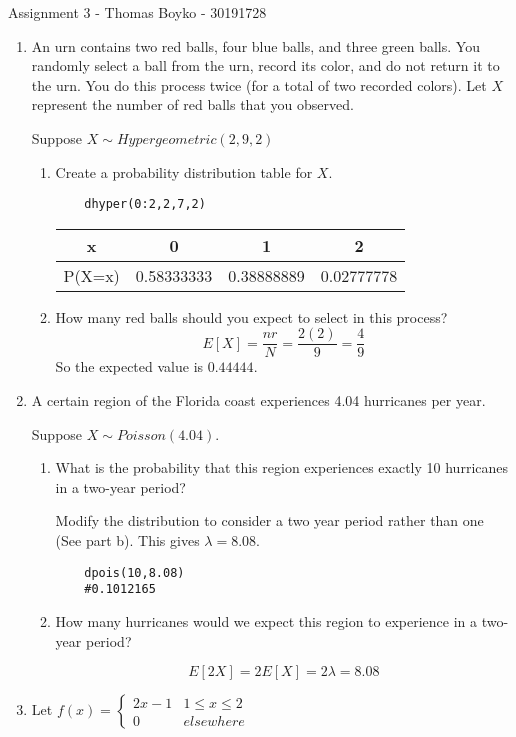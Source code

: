 \documentclass[]{article}
\begin{document}
\huge Assignment 3 - Thomas Boyko - 30191728
\normalsize
\begin{enumerate} 

\item An urn contains two red balls, four blue balls, and three green balls. You randomly select a ball from the urn, record its color, and do not return it to the urn. You do this process twice (for a total of two recorded colors). Let $X$ represent the number of red balls that you observed.

Suppose $X\sim Hypergeometric(2,9,2)$
\begin{enumerate}[label= (\alph*)] 
\item Create a probability distribution table for $X$.
\begin{verbatim}
    dhyper(0:2,2,7,2)
\end{verbatim}
\begin{center}
\begin{tabular}{|c|c|c|c|}
    \hline
    x & 0 & 1 & 2\\
    \hline
    P(X=x)&0.58333333&0.38888889&0.02777778\\
    \hline 
\end{tabular}
\end{center}

\item How many red balls should you expect to select in this process?
\[E[X]=\frac{nr}{N}=\frac{2(2)}{9}=\frac{4}{9}\]
So the expected value is $0.44444$.
\end{enumerate}
\item A certain region of the Florida coast experiences 4.04 hurricanes per year.

Suppose $X\sim Poisson(4.04)$.
\begin{enumerate}[label= (\alph*)] 
\item What is the probability that this region experiences exactly 10 hurricanes in a two-year period?

Modify the distribution to consider a two year period rather than one (See part b). This gives $\lambda = 8.08$.
\begin{verbatim}
    dpois(10,8.08)
    #0.1012165
\end{verbatim}

\item How many hurricanes would we expect this region to experience in a two-year
period?

\[E[2X]=2E[X]=2\lambda=8.08\]

\end{enumerate}
\item Let $f(x) = \begin{cases} 
2x - 1 &1 \leq x \leq 2\\
0& elsewhere
\end{cases}$


\end{enumerate}
\end{document}
